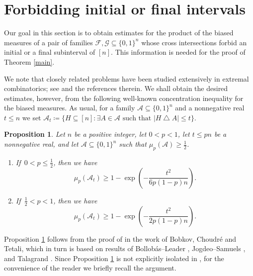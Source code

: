 \documentclass[10pt,a4paper]{amsart}
\newtheorem{prop}[thm]{Proposition}
\theoremstyle{remark}
\newcommand{\meg}{\geqslant}
\newcommand{\mik}{\leqslant}
\newcommand{\Fcal}{\mathcal{F}}
\newcommand{\Gcal}{\mathcal{G}}
\newcommand{\Acal}{\mathcal{A}}
\newcommand{\pmeasure}[1]{\ensuremath{\mu_{p}\left(#1\right)}}
\begin{document}

\section{Forbidding initial or final intervals} \label{sec?}


Our goal in this section is to obtain estimates for the product of the biased measures of a pair of
families $\Fcal, \Gcal\subseteq \{0,1\}^n$ whose cross intersections forbid an initial or a final subinterval of $[n]$.
This information is needed for the proof of Theorem \ref{main}.

We note that closely related problems have been studied extensively in extremal combinatorics; see
\cite{El22,FT18} and the references therein.  We shall obtain the desired estimates, however,
from the following well-known concentration inequality for the biased measures.
As usual, for a family $\Acal\subseteq \{0,1\}^n$ and a nonnegative real $t\mik n$ we set
$\Acal_t\coloneqq \{H\subseteq [n]: \exists A\in\Acal \text{ such that } |H\bigtriangleup A|\mik t\}$.
\begin{prop} \label{p3.1}
Let $n$ be a positive integer, let $0<p<1$, let $t\mik pn$ be a nonnegative real, and let
$\Acal\subseteq \{0,1\}^n$ such that $\pmeasure{\Acal}\meg \frac12$.
\begin{enumerate}
\item[(i)] If\, $0<p\mik \frac12$, then we have
\begin{equation} \label{e3.1}
\pmeasure{\Acal_t}\meg 1-\exp\left(-\frac{t^2}{6p(1-p)n}\right).
\end{equation}
\item[(ii)] If\, $\frac12<p<1$, then we have
\begin{equation} \label{e3.2}
\pmeasure{\Acal_t}\meg 1-\exp\left(-\frac{t^2}{2p(1-p)n}\right).
\end{equation}
\end{enumerate}
\end{prop}
Proposition \ref{p3.1} follows from the proof of \cite[Proposition 2.4]{BHT06}
in the work of Bobkov, Choudr\'{e} and Tetali, which in turn is based on results
of Bollob\'{a}s--Leader \cite{BL91}, Jogdeo--Samuels \cite{JS68}, and Talagrand \cite{Ta89}.
Since Proposition \ref{p3.1} is not explicitly isolated in \cite{BHT06}, for the
convenience of the reader we briefly recall the argument.
\end{document}
